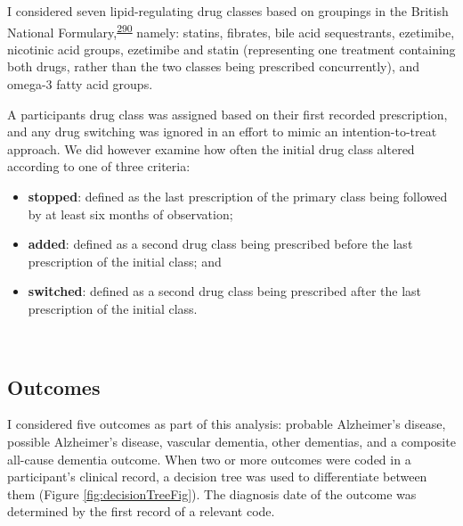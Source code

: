 \documentclass[a4paper, twoside]{templates/ociamthesis}
\providecommand{\tightlist}{%
  \setlength{\itemsep}{0pt}\setlength{\parskip}{0pt}}
\begin{document}
I considered seven lipid-regulating drug classes based on groupings in the British National Formulary,\textsuperscript{\protect\hyperlink{ref-wishart2017}{290}} namely: statins, fibrates, bile acid sequestrants, ezetimibe, nicotinic acid groups, ezetimibe and statin (representing one treatment containing both drugs, rather than the two classes being prescribed concurrently), and omega-3 fatty acid groups.

A participants drug class was assigned based on their first recorded prescription, and any drug switching was ignored in an effort to mimic an intention-to-treat approach. We did however examine how often the initial drug class altered according to one of three criteria:

\begin{itemize}
\tightlist
\item
  \textbf{stopped}: defined as the last prescription of the primary class being followed by at least six months of observation;
\item
  \textbf{added}: defined as a second drug class being prescribed before the last prescription of the initial class; and
\item
  \textbf{switched}: defined as a second drug class being prescribed after the last prescription of the initial class.
\end{itemize}

~

\hypertarget{cprd-outcomes}{%
\subsection{Outcomes}\label{cprd-outcomes}}

I considered five outcomes as part of this analysis: probable Alzheimer's disease, possible Alzheimer's disease, vascular dementia, other dementias, and a composite all-cause dementia outcome. When two or more outcomes were coded in a participant's clinical record, a decision tree was used to differentiate between them (Figure \ref{fig:decisionTreeFig}). The diagnosis date of the outcome was determined by the first record of a relevant code.
\end{document}

